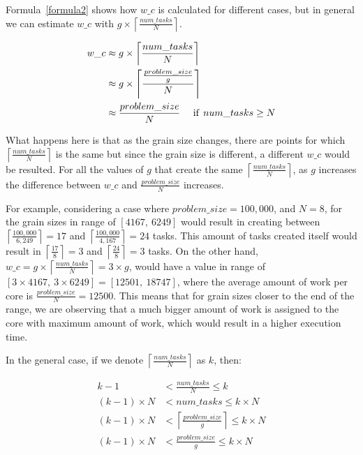 Formula~\ref{formula2} shows how $w\_c$ is calculated for different cases, but in general we can estimate $w\_c$ with $g\times\left \lceil{\frac{num\_{tasks}}{N}}\right \rceil$. 

\begin{equation}\label{formula6}
\begin{aligned}
w\_c&\approx{g\times\left \lceil{\frac{num\_{tasks}}{N}}\right \rceil}\\
&\approx{g\times\left \lceil{\frac{\frac{problem\_{size}}{g}}{N}}\right \rceil}\\
&\approx{\frac{problem\_{size}}{N}} \:\:\text{\:\:\:\:if\:\:} num\_{tasks}\geq{N}
\end{aligned}
\end{equation}

What happens here is that as the grain size changes, there are points for which $\left \lceil{\frac{num\_{tasks}}{N}}\right \rceil$ is the same but since the grain size is different, a different $w\_c$ would be resulted. 
For all the values of $g$ that create the same $\left \lceil{\frac{num\_{tasks}}{N}}\right \rceil$, as $g$ increases the difference between $w\_c$ and $\frac{problem\_{size}}{N}$ increases. 

For example, considering a case where $problem\_{size}=100,000$, and $N=8$, for the grain sizes in range of $[4167,\:6249]$ would result in creating between $\left \lceil{\frac{100,000}{6,249}}\right \rceil=17$ and  $\left \lceil{\frac{100,000}{4,167}}\right \rceil=24$ tasks. This amount of tasks created itself would result in $\left \lceil{\frac{17}{8}}\right \rceil=3$ and  $\left \lceil{\frac{24}{8}}\right \rceil=3$ tasks.
On the other hand, $w\_c=g\times{\left \lceil{\frac{num\_{tasks}}{N}}\right \rceil}=3\times{g}$, would have a value in range of $[3\times4167,\:3\times6249]=[12501,\: 18747]$, where the average amount of work per core is $\frac{problem\_{size}}{N}=12500$. This means that for grain sizes closer to the end of the range, we are observing that a much bigger amount of work is assigned to the core with maximum amount of work, which would result in a higher execution time. 


In the general case, if we denote $\left \lceil{\frac{num\_{tasks}}{N}}\right \rceil$ as $k$, then:


\begin{equation}\label{formula8}
\begin{aligned}
k-1&<{\frac{num\_{tasks}}{N}}\leq{k}\\
(k-1)\times{N}&<num\_{tasks}\leq{k}\times{N}\\
(k-1)\times{N}&<\left \lceil{\frac{problem\_{size}}{g}}\right \rceil\leq{k}\times{N}\\
(k-1)\times{N}&<\frac{problem\_{size}}{g}\leq{{k}\times{N}}\\
\end{aligned}
\end{equation}

